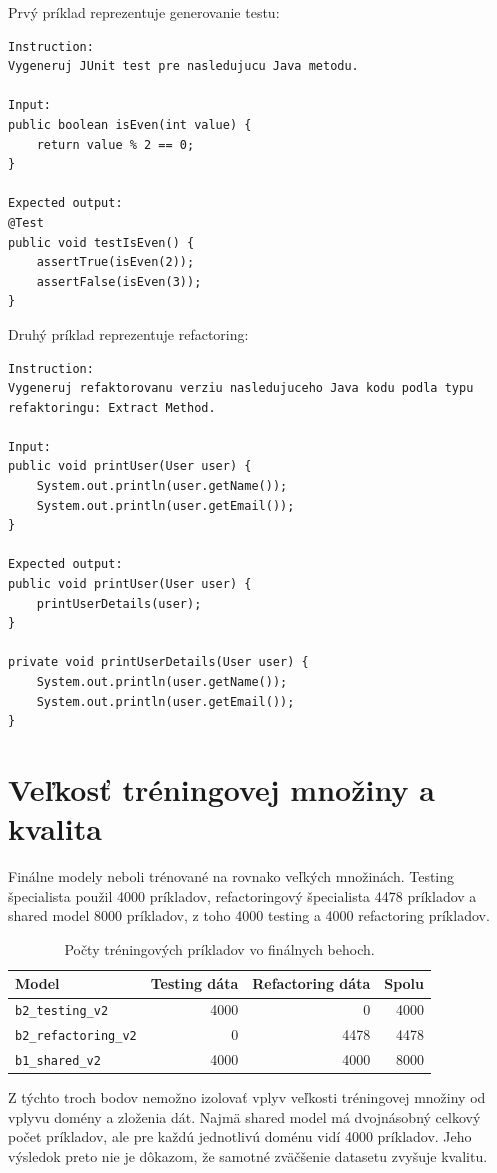 \documentclass[11pt,a4paper]{article}
\newcommand{\modeltest}{\texttt{b2\_testing\_v2}}
\newcommand{\modelref}{\texttt{b2\_refactoring\_v2}}
\newcommand{\modelshared}{\texttt{b1\_shared\_v2}}
\begin{document}
Prvý príklad reprezentuje generovanie testu:

\begin{lstlisting}
Instruction:
Vygeneruj JUnit test pre nasledujucu Java metodu.

Input:
public boolean isEven(int value) {
    return value % 2 == 0;
}

Expected output:
@Test
public void testIsEven() {
    assertTrue(isEven(2));
    assertFalse(isEven(3));
}
\end{lstlisting}

Druhý príklad reprezentuje refactoring:

\begin{lstlisting}
Instruction:
Vygeneruj refaktorovanu verziu nasledujuceho Java kodu podla typu refaktoringu: Extract Method.

Input:
public void printUser(User user) {
    System.out.println(user.getName());
    System.out.println(user.getEmail());
}

Expected output:
public void printUser(User user) {
    printUserDetails(user);
}

private void printUserDetails(User user) {
    System.out.println(user.getName());
    System.out.println(user.getEmail());
}
\end{lstlisting}

\section{Veľkosť tréningovej množiny a kvalita}

Finálne modely neboli trénované na rovnako veľkých množinách. Testing
špecialista použil 4000 príkladov, refactoringový špecialista 4478 príkladov
a shared model 8000 príkladov, z toho 4000 testing a 4000 refactoring
príkladov.

\begin{table}[h]
\centering
\begin{tabular}{lrrr}
\toprule
Model & Testing dáta & Refactoring dáta & Spolu \\
\midrule
\modeltest & 4000 & 0 & 4000 \\
\modelref & 0 & 4478 & 4478 \\
\modelshared & 4000 & 4000 & 8000 \\
\bottomrule
\end{tabular}
\caption{Počty tréningových príkladov vo finálnych behoch.}
\label{tab:training-sizes}
\end{table}

Z týchto troch bodov nemožno izolovať vplyv veľkosti tréningovej množiny od
vplyvu domény a zloženia dát. Najmä shared model má dvojnásobný celkový počet
príkladov, ale pre každú jednotlivú doménu vidí 4000 príkladov. Jeho výsledok
preto nie je dôkazom, že samotné zväčšenie datasetu zvyšuje kvalitu.
\end{document}
